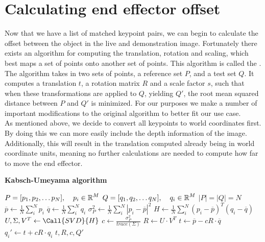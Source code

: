 \section{Calculating end effector offset}
\label{sec:kabsch}
Now that we have a list of matched keypoint pairs, we can begin to calculate the offset between the object in the live and demonstration image. Fortunately there exists an algorithm for computing the translation, rotation and scaling, which best maps a set of points onto another set of points. This algorithm is called the  \cite{kabsch}. The algorithm takes in two sets of points, a reference set $P$, and a test set $Q$. It computes a translation $t$, a rotation matrix $R$ and a scale factor $s$, such that when these transformations are applied to $Q$, yielding $Q'$, the root mean squared distance between $P$ and $Q'$ is minimized. For our purposes we make a number of important modifications to the original algorithm to better fit our use case.\\

As mentioned above, we decide to convert all keypoints to world coordinates first. By doing this we can more easily include the depth information of the image. Additionally, this will result in the translation computed already being in world coordinate units, meaning no further calculations are needed to compute how far to move the end effector.\\

\begin{algorithm}
    \setlength{\baselineskip}{18pt}
    \caption{\textbf{Kabsch-Umeyama algorithm}}
    \label{alg:kabsch}
    \begin{algorithmic}[1]
        \Require $P = [p_1, p_2, \dots p_N], \operatorname{\: \: \: \:} p_i \in \operatorname{\mathbb{R}}^M$
        \Statex $Q = [q_1, q_2, \dots q_N], \operatorname{\: \: \: \:} q_i \in \operatorname{\mathbb{R}}^M$
        \Ensure $|P| = |Q| = N$
            \State $\overline{p} \gets \frac{1}{N}\sum^N_{i} p_i$
            \State $\overline{q} \gets \frac{1}{N}\sum^N_{i} q_i$
            \State $\sigma^2_P \gets \frac{1}{N}\sum^N_{i} |p_i - \overline{p}|^2$
            \State $H \gets \frac{1}{N}\sum^N_{i} (p_i - \overline{p})^T(q_i - \overline{q})$ 
            \State $U, \Sigma, V^T \gets \Call{SVD}{H}$ 
            \State $c \gets \frac{\sigma^2_P}{trace(\Sigma)}$
            \State $R \gets U \cdot V^T$
            \State $t \gets \overline{p} - cR \cdot \overline{q} $
                \State $q_i' \gets t + cR \cdot q_i$
            \EndFor
            \State \Output $t, R, c, Q'$
        \EndProcedure
        
    \end{algorithmic}
\end{algorithm}

